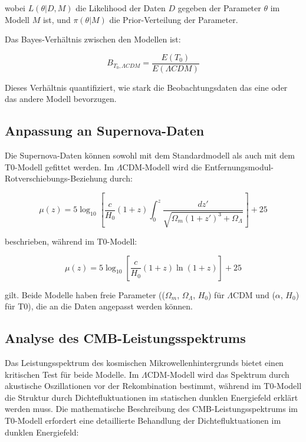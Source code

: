 \documentclass[a4paper,12pt]{article}
\begin{document}
wobei $L(\theta|D,M)$ die Likelihood der Daten $D$ gegeben der Parameter $\theta$ im Modell $M$ ist, und $\pi(\theta|M)$ die Prior-Verteilung der Parameter.

Das Bayes-Verhältnis zwischen den Modellen ist:

\begin{equation}
	B_{T_0,\Lambda CDM} = \frac{E(T_0)}{E(\Lambda CDM)}
\end{equation}

Dieses Verhältnis quantifiziert, wie stark die Beobachtungsdaten das eine oder das andere Modell bevorzugen.

\subsection{Anpassung an Supernova-Daten}

Die Supernova-Daten können sowohl mit dem Standardmodell als auch mit dem T0-Modell gefittet werden. Im $\Lambda$CDM-Modell wird die Entfernungsmodul-Rotverschiebungs-Beziehung durch:

\begin{equation}
	\mu(z) = 5 \log_{10}\left[\frac{c}{H_0}(1+z)\int_0^z \frac{dz'}{\sqrt{\Omega_m(1+z')^3 + \Omega_{\Lambda}}}\right] + 25
\end{equation}

beschrieben, während im T0-Modell:

\begin{equation}
	\mu(z) = 5 \log_{10}\left[\frac{c}{H_0}(1+z)\ln(1+z)\right] + 25
\end{equation}

gilt. Beide Modelle haben freie Parameter (($\Omega_m$, $\Omega_{\Lambda}$, $H_0$) für $\Lambda$CDM und ($\alpha$, $H_0$) für T0), die an die Daten angepasst werden können.

\subsection{Analyse des CMB-Leistungsspektrums}

Das Leistungsspektrum des kosmischen Mikrowellenhintergrunds bietet einen kritischen Test für beide Modelle. Im $\Lambda$CDM-Modell wird das Spektrum durch akustische Oszillationen vor der Rekombination bestimmt, während im T0-Modell die Struktur durch Dichtefluktuationen im statischen dunklen Energiefeld erklärt werden muss. Die mathematische Beschreibung des CMB-Leistungsspektrums im T0-Modell erfordert eine detaillierte Behandlung der Dichtefluktuationen im dunklen Energiefeld:
\end{document}
